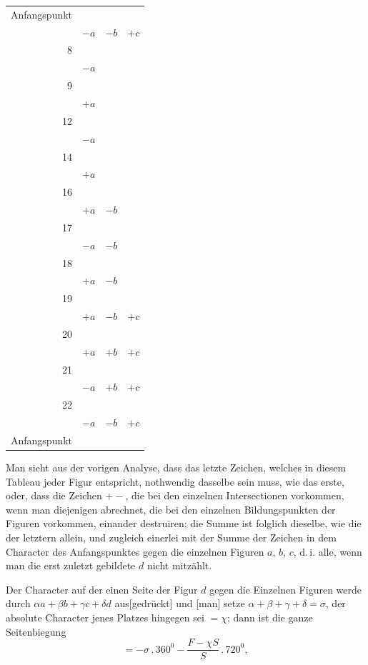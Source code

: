 %
\begin{center}\begin{tabular}{r|ccc}
Anfangspunkt&&&\\
&$-a$&$-b$&$+c$\\
8&&&\\
&$-a$&&\\
9&&&\\
&$+a$&&\\
12&&&\\
&$-a$&&\\
14&&&\\
&$+a$&&\\
16&&&\\
&$+a$&$-b$&\\
17&&&\\
&$-a$&$-b$&\\
18&&&\\
&$+a$&$-b$&\\
19&&&\\
&$+a$&$-b$&$+c$\\
20&&&\\
&$+a$&$+b$&$+c$\\
21&&&\\
&$-a$&$+b$&$+c$\\
22&&&\\
&$-a$&$-b$&$+c$\\
Anfangspunkt&&&\\
\end{tabular}\end{center}
Man sieht aus der vorigen Analyse, dass das letzte Zeichen, welches in
diesem Tableau jeder Figur entspricht, nothwendig dasselbe sein muss,
wie das erste, oder, dass die Zeichen $+-$, die bei den einzelnen
Intersectionen vorkommen, wenn man diejenigen abrechnet, die bei den
einzelnen Bildungspunkten der Figuren vorkommen, einander destruiren;
die Summe  ist folglich dieselbe, wie die der letztern allein, und
zugleich einerlei mit der Summe der Zeichen in dem Character des
Anfangspunktes gegen die einzelnen Figuren $a$, $b$, $c$, d.\,i. alle,
wenn man die erst zuletzt gebildete $d$ nicht mitzählt.
\par{}
Der Character auf der einen Seite der Figur $d$ gegen die Einzelnen
Figuren werde durch $\alpha a+\beta b+\gamma c+\delta d$ aus[gedrückt]
und [man] setze $\alpha+\beta+\gamma+\delta=\sigma$, der absolute
Character jenes Platzes hingegen sei $=\chi$; dann ist die ganze
Seitenbiegung
\[
= -\sigma\,.\,360^0 - \frac{F-\chi S}{S}\,.\,720^0,
\]
